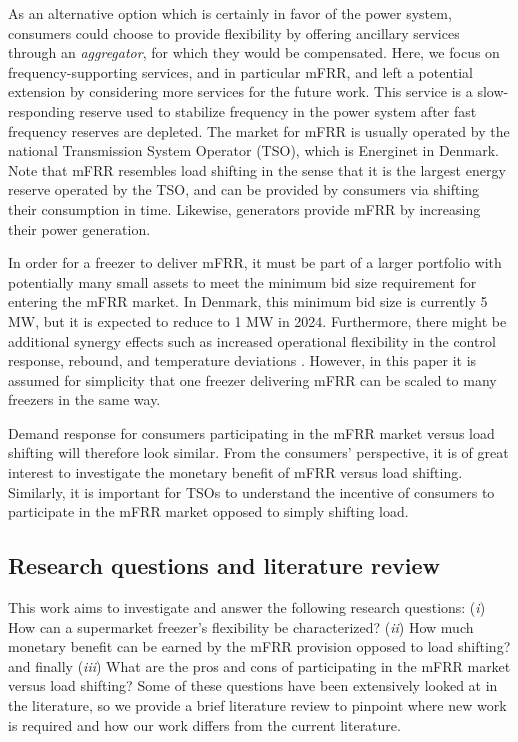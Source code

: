 As an alternative option which is certainly in favor of the power system, consumers could choose to provide flexibility by offering ancillary services through an \textit{aggregator}, for which they would be compensated. Here, we focus on frequency-supporting services, and in particular mFRR, and left a potential extension by considering more services for the future work. This service is a slow-responding reserve used to stabilize frequency in the power system after fast frequency reserves are depleted. The market for mFRR is usually operated by the national Transmission System Operator (TSO), which is Energinet in Denmark. Note that mFRR resembles load shifting in the sense that it is the largest energy reserve operated by the TSO, and can be provided by consumers via shifting their consumption in time. Likewise, generators provide mFRR by increasing their power generation.

In order for a freezer to deliver mFRR, it must be part of a larger portfolio with potentially many small assets to meet the minimum bid size requirement for entering the mFRR market. In Denmark, this minimum bid size is currently 5 MW, but it is expected to reduce to 1 MW in 2024. Furthermore, there might be additional synergy effects such as increased operational flexibility in the control response, rebound, and temperature deviations \cite{koch2011modeling}. However, in this paper it is assumed for simplicity that one freezer delivering mFRR can be scaled to many freezers in the same way.

Demand response for consumers participating in the mFRR market versus load shifting will therefore look similar. From the consumers' perspective, it is of great interest to investigate the monetary benefit of mFRR versus load shifting. Similarly, it is important for TSOs to understand the incentive of consumers to participate in the mFRR market opposed to simply shifting load.

\vspace{-1mm}
\subsection{Research questions and literature review}
%
This work aims to investigate and answer the following research questions: (\textit{i}) How can a supermarket freezer's flexibility be characterized? (\textit{ii}) How much monetary benefit can be earned by the mFRR provision opposed to load shifting? and finally (\textit{iii})
What are the pros and cons of participating in the mFRR market versus load shifting? Some of these questions have been extensively looked at  in the literature, so we provide a brief literature review to pinpoint where new work is required and how our work differs from the current literature.




